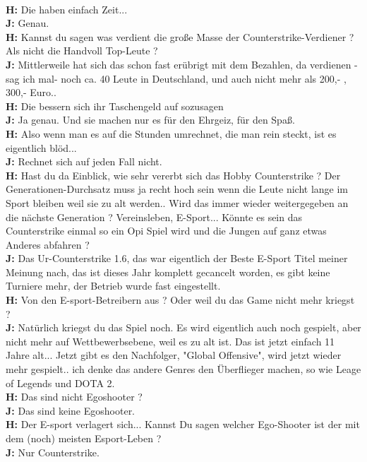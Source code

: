 \documentclass[10pt,a4paper,ngerman,twoside]{article} %
\begin{document}
\\ \textbf{H:} Die haben einfach Zeit...
\\ \textbf{J:} Genau.
\\ \textbf{H:} Kannst du sagen was verdient die große Masse der Counterstrike-Verdiener ? Als nicht die Handvoll Top-Leute ?
\\ \textbf{J:} Mittlerweile hat sich das schon fast erübrigt mit dem Bezahlen, da verdienen -sag ich mal- noch ca. 40 Leute in Deutschland, und auch nicht mehr als 200,- , 300,- Euro..
\\ \textbf{H:} Die bessern sich ihr Taschengeld auf sozusagen
\\ \textbf{J:} Ja genau. Und sie machen nur es für den Ehrgeiz, für den Spaß.
\\ \textbf{H:} Also wenn man es auf die Stunden umrechnet, die man rein steckt, ist es eigentlich blöd...
\\ \textbf{J:} Rechnet sich auf jeden Fall nicht.
\\ \textbf{H:} Hast du da Einblick, wie sehr vererbt sich das Hobby Counterstrike ? Der  Generationen-Durchsatz muss ja recht hoch sein wenn die Leute nicht lange im Sport bleiben weil sie zu alt werden.. Wird das immer wieder weitergegeben an die nächste Generation ? Vereinsleben, E-Sport... Könnte es sein das Counterstrike einmal so ein Opi Spiel wird und die Jungen auf ganz etwas Anderes abfahren ?
\\ \textbf{J:} Das Ur-Counterstrike 1.6, das war eigentlich der Beste E-Sport Titel meiner Meinung nach, das ist dieses Jahr komplett gecancelt worden, es gibt keine Turniere mehr, der Betrieb wurde fast eingestellt.
\\ \textbf{H:} Von den E-sport-Betreibern aus ? Oder weil du das Game nicht mehr kriegst ?
\\ \textbf{J:} Natürlich kriegst du das Spiel noch. Es wird eigentlich auch noch gespielt, aber nicht mehr auf Wettbewerbsebene, weil es zu alt ist. Das ist jetzt einfach 11 Jahre alt... Jetzt gibt es den Nachfolger, "Global Offensive", wird jetzt wieder mehr gespielt.. ich denke das andere Genres den Überflieger machen, so wie Leage of Legends und DOTA 2.
\\ \textbf{H:} Das sind nicht Egoshooter ?
\\ \textbf{J:} Das sind keine Egoshooter.
\\ \textbf{H:} Der E-sport verlagert sich... Kannst Du sagen welcher Ego-Shooter ist der mit dem (noch) meisten Esport-Leben ?
\\ \textbf{J:} Nur Counterstrike.
\end{document}

